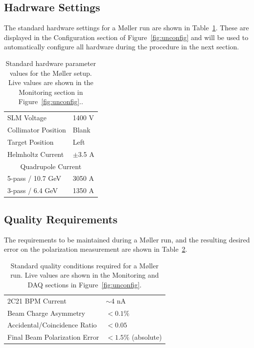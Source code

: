 \documentclass[amsmath,amssymb,notitlepage,12pt]{revtex4}
\begin{document}
\subsection{Hadrware Settings}
The standard hardware settings for a M{\o}ller run are shown in Table~\ref{tab:pars}.  These are displayed in the Configuration section of Figure~\ref{fig:unconfig} and will be used to automatically configure all hardware during the procedure in the next section.

\begin{table}[htbp]\centering
    \begin{tabular}{ll}\toprule[1.5pt]
        SLM Voltage & 1400 V \\
        Collimator Position & Blank \\
        Target Position & Left \\
        Helmholtz Current & $\pm$3.5 A \\
        \cmidrule[0.5pt]{1-2}
        \multicolumn{2}{c}{Quadrupole Current} \\
        5-pass / 10.7 GeV & 3050 A\\
        3-pass / 6.4 GeV & 1350 A\\
        \bottomrule[1.5pt]
    \end{tabular}
    \caption{Standard hardware parameter values for the M{\o}ller setup.  Live values are shown in the Monitoring section in Figure~\ref{fig:unconfig}.\label{tab:pars}.}
\end{table}

\subsection{Quality Requirements}\label{sec:quality}
The requirements to be maintained during a M{\o}ller run, and the resulting desired error on the polarization measurement are shown in Table~\ref{tab:reqs}.
\begin{table}[htbp]\centering
    \begin{tabular}{ll}\toprule[1.5pt]
        2C21 BPM Current & $\sim$4 nA\\
        Beam Charge Asymmetry & $<0.1\%$\\
        Accidental/Coincidence Ratio & $<0.05$ \\
        Final Beam Polarization Error & $<1.5\%$ (absolute)\\
        \bottomrule[1.5pt]
    \end{tabular}
    \caption{Standard quality conditions required for a M{\o}ller run.  Live values are shown in the Monitoring and DAQ sections in Figure~\ref{fig:unconfig}.\label{tab:reqs}}
\end{table}
\end{document}

